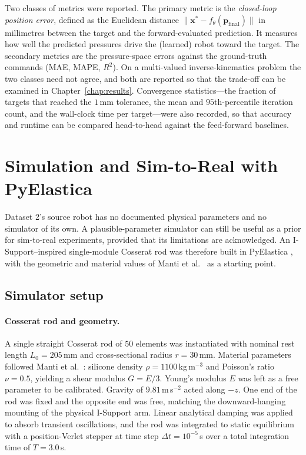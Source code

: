 Two classes of metrics were reported. The primary metric is the \emph{closed-loop position error}, defined as the Euclidean distance $\| \mathbf{x}^{*} - f_{\theta}(\mathbf{p}_{\mathrm{final}}) \|$ in millimetres between the target and the forward-evaluated prediction. It measures how well the predicted pressures drive the (learned) robot toward the target. The secondary metrics are the pressure-space errors against the ground-truth commands (MAE, MAPE, $R^{2}$). On a multi-valued inverse-kinematics problem the two classes need not agree, and both are reported so that the trade-off can be examined in Chapter~\ref{chap:results}. Convergence statistics---the fraction of targets that reached the $1$\,mm tolerance, the mean and $95$th-percentile iteration count, and the wall-clock time per target---were also recorded, so that accuracy and runtime can be compared head-to-head against the feed-forward baselines.

\section{Simulation and Sim-to-Real with PyElastica}
\label{sec:sim}

Dataset 2's source robot has no documented physical parameters and no simulator of its own. A plausible-parameter simulator can still be useful as a prior for sim-to-real experiments, provided that its limitations are acknowledged. An I-Support--inspired single-module Cosserat rod was therefore built in PyElastica \cite{gazzola2018pyelastica}, with the geometric and material values of Manti et al.\ \cite{manti2016soft} as a starting point.

\subsection{Simulator setup}
\label{sec:sim_setup}

\paragraph{Cosserat rod and geometry.}
A single straight Cosserat rod of $50$ elements was instantiated with nominal rest length $L_0 = 205$\,mm and cross-sectional radius $r = 30$\,mm. Material parameters followed Manti et al.\ \cite{manti2016soft}: silicone density $\rho = 1100$\,kg\,m$^{-3}$ and Poisson's ratio $\nu = 0.5$, yielding a shear modulus $G = E / 3$. Young's modulus $E$ was left as a free parameter to be calibrated. Gravity of $9.81$\,m\,s$^{-2}$ acted along $-z$. One end of the rod was fixed and the opposite end was free, matching the downward-hanging mounting of the physical I-Support arm. Linear analytical damping was applied to absorb transient oscillations, and the rod was integrated to static equilibrium with a position-Verlet stepper at time step $\Delta t = 10^{-5}$\,s over a total integration time of $T = 3.0$\,s.

